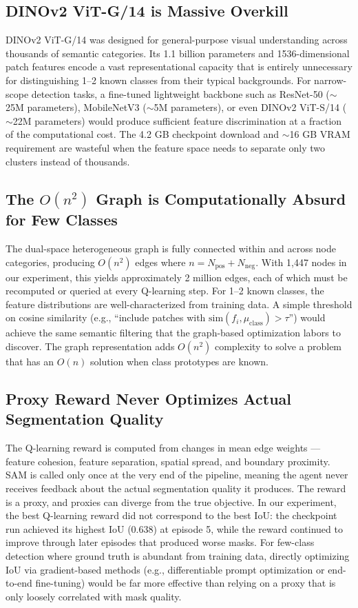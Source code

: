 \documentclass[11pt]{article}
\begin{document}
\subsection{DINOv2 ViT-G/14 is Massive Overkill}

DINOv2 ViT-G/14 was designed for general-purpose visual understanding across thousands of semantic categories. Its 1.1 billion parameters and 1536-dimensional patch features encode a vast representational capacity that is entirely unnecessary for distinguishing 1--2 known classes from their typical backgrounds. For narrow-scope detection tasks, a fine-tuned lightweight backbone such as ResNet-50 ($\sim$25M parameters), MobileNetV3 ($\sim$5M parameters), or even DINOv2 ViT-S/14 ($\sim$22M parameters) would produce sufficient feature discrimination at a fraction of the computational cost. The 4.2 GB checkpoint download and $\sim$16 GB VRAM requirement are wasteful when the feature space needs to separate only two clusters instead of thousands.

\subsection{The $O(n^2)$ Graph is Computationally Absurd for Few Classes}

The dual-space heterogeneous graph is fully connected within and across node categories, producing $O(n^2)$ edges where $n = N_{\text{pos}} + N_{\text{neg}}$. With 1,447 nodes in our experiment, this yields approximately 2 million edges, each of which must be recomputed or queried at every Q-learning step. For 1--2 known classes, the feature distributions are well-characterized from training data. A simple threshold on cosine similarity (e.g., ``include patches with $\text{sim}(f_i, \mu_{\text{class}}) > \tau$'') would achieve the same semantic filtering that the graph-based optimization labors to discover. The graph representation adds $O(n^2)$ complexity to solve a problem that has an $O(n)$ solution when class prototypes are known.

\subsection{Proxy Reward Never Optimizes Actual Segmentation Quality}

The Q-learning reward is computed from changes in mean edge weights --- feature cohesion, feature separation, spatial spread, and boundary proximity. SAM is called only once at the very end of the pipeline, meaning the agent never receives feedback about the actual segmentation quality it produces. The reward is a proxy, and proxies can diverge from the true objective. In our experiment, the best Q-learning reward did not correspond to the best IoU: the checkpoint run achieved its highest IoU (0.638) at episode 5, while the reward continued to improve through later episodes that produced worse masks. For few-class detection where ground truth is abundant from training data, directly optimizing IoU via gradient-based methods (e.g., differentiable prompt optimization or end-to-end fine-tuning) would be far more effective than relying on a proxy that is only loosely correlated with mask quality.
\end{document}

